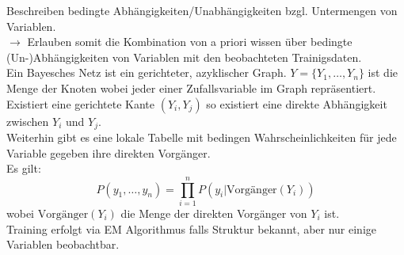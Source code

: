 Beschreiben bedingte Abhängigkeiten/Unabhängigkeiten bzgl. Untermengen von
Variablen.\\
$\rightarrow$ Erlauben somit die Kombination von a priori wissen über bedingte
(Un-)Abhängigkeiten von Variablen mit den beobachteten Trainigsdaten. \\
Ein Bayesches Netz ist ein gerichteter, azyklischer Graph. $Y = \{Y_1,\dots,Y_n\}$
ist die Menge der Knoten wobei jeder einer Zufallsvariable im Graph repräsentiert.
Existiert eine gerichtete Kante $(Y_i,Y_j)$ so existiert eine direkte Abhängigkeit
zwischen $Y_i$ und $Y_j$. \\
Weiterhin gibt es eine lokale Tabelle mit bedingen Wahrscheinlichkeiten für jede
Variable gegeben ihre direkten Vorgänger.\\
Es gilt:
\begin{displaymath}
    P(y_1,\dots,y_n) = \prod_{i=1}^n P(y_i | \text{Vorgänger}(Y_i))
\end{displaymath}
wobei $\text{Vorgänger}(Y_i)$ die Menge der direkten Vorgänger von $Y_i$ ist. \\
Training erfolgt via EM Algorithmus falls Struktur bekannt, aber nur einige
Variablen beobachtbar.
